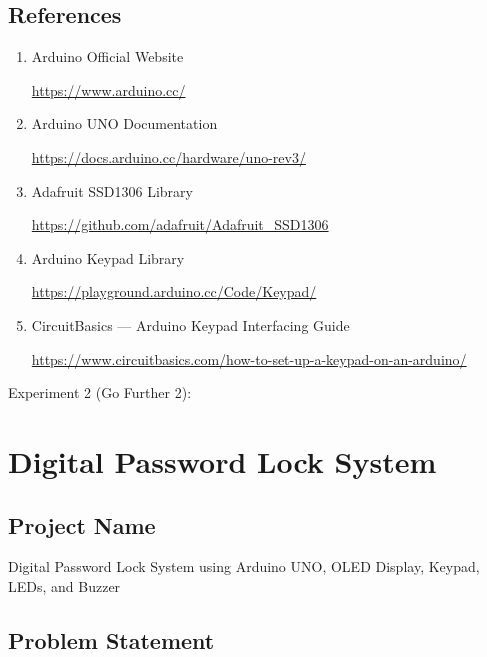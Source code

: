 
\subsection{References}

\begin{enumerate}

\item Arduino Official Website

\url{https://www.arduino.cc/}

\item Arduino UNO Documentation

\url{https://docs.arduino.cc/hardware/uno-rev3/}

\item Adafruit SSD1306 Library

\url{https://github.com/adafruit/Adafruit_SSD1306}

\item Arduino Keypad Library

\url{https://playground.arduino.cc/Code/Keypad/}

\item CircuitBasics — Arduino Keypad Interfacing Guide

\url{https://www.circuitbasics.com/how-to-set-up-a-keypad-on-an-arduino/}

\end{enumerate}


\clearpage
Experiment 2 (Go Further 2):
\section{Digital Password Lock System}


\subsection{Project Name}

Digital Password Lock System using Arduino UNO, OLED Display, Keypad, LEDs, and Buzzer


\subsection{Problem Statement}

